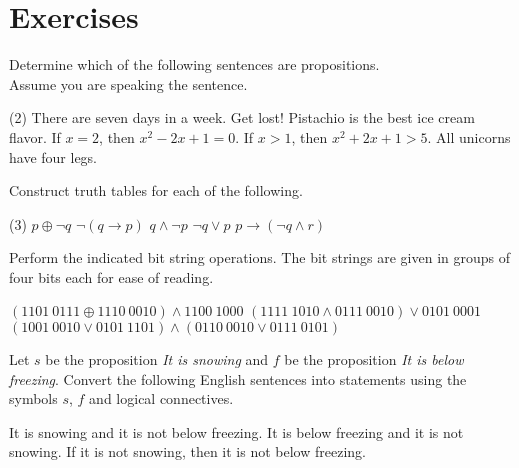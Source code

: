 \clearpage

\section{Exercises}
\begin{exer}
Determine which of the following sentences are propositions. \\
Assume you are speaking the sentence.
 
\begin{tasks}(2)
	\task There are seven days in a week.
	\task Get lost!
	\task Pistachio is the best ice cream flavor.
	\task  If $x=2$, then $x^2-2x+1=0$.
	\task If $x>1$, then $x^2+2x+1>5$.
	\task All unicorns have four legs.\label{ex:1.last}
\end{tasks}
  
\end{exer}

\begin{exer}
Construct truth tables for each of the following.
\begin{tasks}(3)
	\task $p\oplus \lnot q$	
	\task $\lnot (q\to  p)$	
	\task $q \wedge \lnot p$	
	\task $\lnot q\lor p$	
	\task $p\to (\lnot q\wedge r)$
\end{tasks}

\end{exer}


\begin{exer}
Perform the indicated bit string operations. The bit strings are given
in groups of four bits each for ease of reading. 
\begin{tasks}
      \task $(1101~0111\oplus 1110~0010)\wedge 1100~1000$
      \task $(1111~1010 \wedge 0111~0010)\lor 0101~0001$
      \task $(1001~0010 \lor 0101~1101)\wedge (0110~0010 \lor 0111~0101)$
\end{tasks}
\end{exer}

\begin{exer}
 Let $s$ be the proposition {\itshape It is snowing} and $f$ be the proposition 
{\itshape It is below freezing}. Convert the following English sentences into statements
using the symbols $s$, $f$ and logical connectives.
\begin{tasks}
      \task It is snowing and it is not below freezing.
      \task It is below freezing and  it is not snowing.
      \task If it is not snowing, then it is not below freezing.
\end{tasks}
\end{exer}


